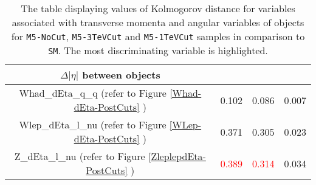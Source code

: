 \begin{table}
\begin{tabular}{|c|c|c|c|}
		\hline
		\textbf{$\Delta|\eta|$ between objects}&  && \\
		\hline
		Whad\_dEta\_q\_q (refer to Figure  \ref{Whad-dEta-PostCuts} )& 0.102& 0.086 & 0.007  \\
		\hline
		Wlep\_dEta\_l\_nu (refer to Figure  \ref{WLep-dEta-PostCuts} )& 0.371& 0.305&0.023 \\
		\hline
		Z\_dEta\_l\_nu  (refer to Figure  \ref{ZleplepdEta-PostCuts} )& \textcolor{red}{0.389} & \textcolor{red}{0.314} &0.034 \\
		\hline
	\end{tabular}
\caption{The table displaying values of Kolmogorov distance for variables associated with transverse momenta and angular variables of objects for \texttt{M5-NoCut}, \texttt{M5-3TeVCut} and \texttt{M5-1TeVCut} samples in comparison to \texttt{SM}. The most discriminating variable is highlighted. }
\label{KS-Table1}
\end{table}


%
%
